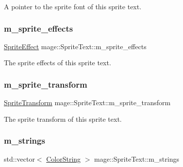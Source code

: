 A pointer to the sprite font of this sprite text. \hypertarget{classmage_1_1_sprite_text_acc64029be6634cac0651ceaaa0f84a3b}{}\label{classmage_1_1_sprite_text_acc64029be6634cac0651ceaaa0f84a3b} 
\subsubsection{\texorpdfstring{m\+\_\+sprite\+\_\+effects}{m\_sprite\_effects}}
{\footnotesize\ttfamily \hyperlink{namespacemage_a9cfe18123066ba4236f548f9de75d881}{Sprite\+Effect} mage\+::\+Sprite\+Text\+::m\+\_\+sprite\+\_\+effects\hspace{0.3cm}{\ttfamily [private]}}

The sprite effects of this sprite text. \hypertarget{classmage_1_1_sprite_text_ade755cb73d8db4f388063cda1a351c50}{}\label{classmage_1_1_sprite_text_ade755cb73d8db4f388063cda1a351c50} 
\subsubsection{\texorpdfstring{m\+\_\+sprite\+\_\+transform}{m\_sprite\_transform}}
{\footnotesize\ttfamily \hyperlink{classmage_1_1_sprite_transform}{Sprite\+Transform} mage\+::\+Sprite\+Text\+::m\+\_\+sprite\+\_\+transform\hspace{0.3cm}{\ttfamily [private]}}

The sprite transform of this sprite text. \hypertarget{classmage_1_1_sprite_text_aadda462c0b67282ef86a7cb2b235367c}{}\label{classmage_1_1_sprite_text_aadda462c0b67282ef86a7cb2b235367c} 
\subsubsection{\texorpdfstring{m\+\_\+strings}{m\_strings}}
{\footnotesize\ttfamily std\+::vector$<$ \hyperlink{classmage_1_1_color_string}{Color\+String} $>$ mage\+::\+Sprite\+Text\+::m\+\_\+strings\hspace{0.3cm}{\ttfamily [private]}}

